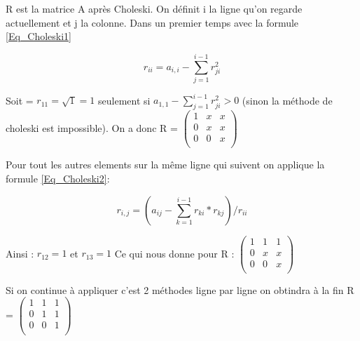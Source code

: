 \documentclass[12pt]{article}
\begin{document}
  \vspace{0.3cm}
  
  R est la matrice A après Choleski. On définit i la ligne qu'on regarde actuellement et j la colonne. Dans un premier temps avec la formule \ref{Eq_Choleski1}

  \begin{equation}
    \label{Eq_Choleski1}
    r_{i i} = a_{i,i} - \sum_{j = 1}^{i-1} r_{j i}^2 
  \end{equation}
  
 Soit = $r_{1 1} = \sqrt{1} = 1 $ seulement si $a_{1,1} - \sum_{j = 1}^{i-1} r_{j i}^2 > 0 $ (sinon la méthode de choleski est impossible). On a donc R =
$
\begin{pmatrix}
 
    1 & x & x \\

    0 & x & x \\

    0 & 0 & x \\

  \end{pmatrix}
  $

   \vspace{0.2cm}
  
  Pour tout les autres elements sur la même ligne qui suivent on applique la formule \ref{Eq_Choleski2}:

  \begin{equation}
    \label{Eq_Choleski2}
    r_{i,j} = (a_{i j} - \sum_{k = 1}^{i-1} r_{k i} * r_{k j}) / r_{i i}
  \end{equation}


 Ainsi : $ r_{1 2} = 1$ et $ r_{1 3} = 1$ Ce qui nous donne pour R : $
\begin{pmatrix}
 
    1 & 1 & 1 \\

    0 & x & x \\

    0 & 0 & x \\

  \end{pmatrix}
  $

  Si on continue à appliquer c'est 2 méthodes ligne par ligne on obtindra à la fin R = $
 \begin{pmatrix}
 
    1 & 1 & 1 \\

    0 & 1 & 1 \\

    0 & 0 & 1 \\

  \end{pmatrix}
  $
\end{document}
